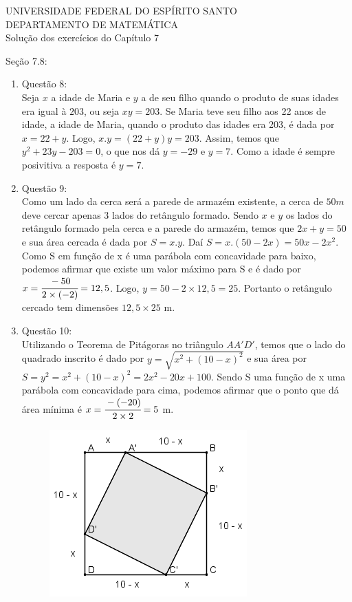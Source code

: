 \documentclass[a4paper]{report}
\begin{document}
\begin{center}
UNIVERSIDADE FEDERAL DO ESPÍRITO SANTO\\DEPARTAMENTO DE MATEMÁTICA\\
\vspace{0.6cm}
Solução dos exercícios do Capítulo 7
\vspace{0.2cm}

\end{center}
Seção 7.8:
\begin{enumerate}
		\item Questão 8:\\Seja $x$ a idade de Maria e $y$ a de seu filho quando o produto de suas idades era igual à $203$, ou seja $xy=203$. Se Maria teve seu filho aos 22 anos de idade, a idade de Maria, quando o produto das idades era 203, é dada por $x = 22 + y$. Logo, $x.y = (22 + y)y = 203$. Assim, temos que $y^2 + 23y - 203 = 0$, o que nos dá $y = -29$ e $y = 7$. Como a idade é sempre posivitiva a resposta é $y = 7$.
		
		\item Questão 9:\\Como um lado da cerca será a parede de armazém existente, a cerca de $50 m$ deve cercar apenas $3$ lados do retângulo formado. Sendo $x$ e $y$ os lados do retângulo formado pela cerca e a parede do armazém, temos que $2x+y=50$ e sua área cercada é dada por $S = x.y$. Daí $S = x.(50 - 2x) = 50x - 2x^2$. Como S em função de x é uma parábola com concavidade para baixo, podemos afirmar que existe um valor máximo para S e é dado por $x=\cfrac{-50}{2\times(-2)} = 12,5$. Logo, $y = 50 - 2\times12,5 = 25$. Portanto o retângulo cercado tem dimensões $12,5\times 25$ m.

		\item Questão 10:\\Utilizando o Teorema de Pitágoras no triângulo $AA'D'$, temos que o lado do quadrado inscrito é dado por $y=\sqrt{x^2+ (10-x)^2}$ e sua área por $S = y^2 = x^2+ (10-x)^2 = 2x^2-20x+100$. Sendo S uma função de x uma parábola com concavidade para cima, podemos afirmar que o ponto que dá área mínima é $x=\cfrac{-(-20)}{2\times2}=5$ m.
		
		\begin{figure}[!th]
			\centering
		 	\includegraphics[height=0.3\linewidth]{q10.png}
		\end{figure}


\end{enumerate}
\end{document}
